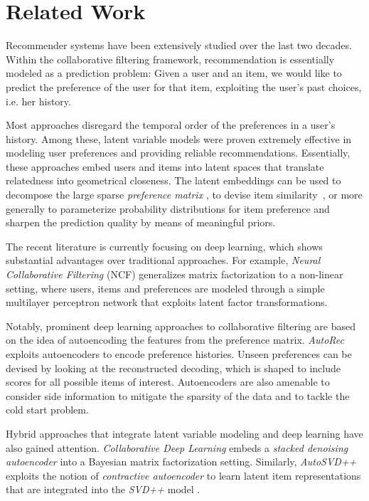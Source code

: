 \documentclass[sigconf]{acmart}
\numberwithin{equation}{section}
\begin{document}
\section{Related Work}
\label{sec:related}

 
Recommender systems have been extensively studied over the last two
decades. Within the collaborative filtering framework, recommendation is
essentially modeled as a prediction problem: Given a user and an item,
we would like to predict the preference of the user for that item,
exploiting the user's past choices, i.e. her history.

Most approaches disregard the temporal
order of the preferences in a user's history. Among these,
latent variable models
\cite{Hofmann:2004,Ruslan:2008,Salakhutdinov:2008,Rendle:2009,flda,Ning:2011,Wang:2011,Rendle:2012,Kabbur:2013,2014Barbieri,BM2011}
were proven extremely effective
in modeling user preferences and providing reliable recommendations.    
Essentially, these approaches embed users and items into latent spaces
that translate relatedness into geometrical closeness. The latent
embeddings can be used to decompose
the large sparse \emph{preference matrix} 
\cite{Salakhutdinov:2008,Ruslan:2008,flda}, to devise item
similarity~\cite{Ning:2011, Kabbur:2013}, or more generally to
parameterize probability distributions for item preference \cite{Rendle:2009,
  Hofmann:2004,Wang:2011,Rendle:2012} and sharpen the prediction
quality by means of meaningful priors. 


The recent literature is currently focusing on deep learning, which
shows substantial advantages over traditional approaches. 
For example, \emph{Neural Collaborative Filtering} (NCF) \cite{He17}
generalizes matrix factorization to a non-linear setting, where users,
items and preferences are modeled through a simple multilayer
perceptron network that exploits latent factor transformations.

Notably, prominent deep learning approaches to collaborative
filtering are based on the idea of autoencoding the features from the
preference matrix.  \emph{AutoRec} \cite{Sedhain15} exploits
autoencoders to encode preference histories. Unseen preferences can
be devised by looking at the reconstructed decoding, which is shaped to
include scores for all possible items of interest.
Autoencoders are also amenable to consider side information
\cite{strub15} to mitigate the sparsity of the data and to tackle the
cold start problem.

Hybrid approaches that integrate latent variable modeling and deep
learning have also gained attention. \emph{Collaborative Deep
  Learning} \cite{Wang15} embeds a \emph{stacked denoising
  autoencoder} \cite{Vincent10} into a Bayesian matrix factorization
setting.  Similarly, \emph{AutoSVD++} \cite{Zhang17} exploits
the notion of \emph{contractive autoencoder} \cite{Rifai:2011} to
learn latent item representations that are integrated into the
\emph{SVD++} model \cite{Koren08}.
\end{document}
